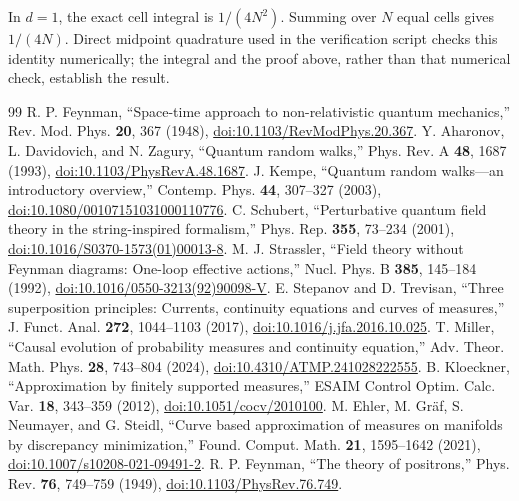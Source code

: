 \documentclass[aip,jmp,reprint,onecolumn,amsmath,amssymb]{revtex4-2}
\theoremstyle{definition}
\begin{document}
In $d=1$, the exact cell integral is $1/(4N^2)$. Summing over $N$ equal cells gives $1/(4N)$. Direct midpoint quadrature used in the verification script checks this identity numerically; the integral and the proof above, rather than that numerical check, establish the result.
\begin{thebibliography}{99}
 R. P. Feynman, ``Space-time approach to non-relativistic quantum mechanics,'' Rev. Mod. Phys. \textbf{20}, 367 (1948), \href{https://doi.org/10.1103/RevModPhys.20.367}{doi:10.1103/RevModPhys.20.367}.
 Y. Aharonov, L. Davidovich, and N. Zagury, ``Quantum random walks,'' Phys. Rev. A \textbf{48}, 1687 (1993), \href{https://doi.org/10.1103/PhysRevA.48.1687}{doi:10.1103/PhysRevA.48.1687}.
 J. Kempe, ``Quantum random walks---an introductory overview,'' Contemp. Phys. \textbf{44}, 307--327 (2003), \href{https://doi.org/10.1080/00107151031000110776}{doi:10.1080/00107151031000110776}.
 C. Schubert, ``Perturbative quantum field theory in the string-inspired formalism,'' Phys. Rep. \textbf{355}, 73--234 (2001), \href{https://doi.org/10.1016/S0370-1573(01)00013-8}{doi:10.1016/S0370-1573(01)00013-8}.
 M. J. Strassler, ``Field theory without Feynman diagrams: One-loop effective actions,'' Nucl. Phys. B \textbf{385}, 145--184 (1992), \href{https://doi.org/10.1016/0550-3213(92)90098-V}{doi:10.1016/0550-3213(92)90098-V}.
 E. Stepanov and D. Trevisan, ``Three superposition principles: Currents, continuity equations and curves of measures,'' J. Funct. Anal. \textbf{272}, 1044--1103 (2017), \href{https://doi.org/10.1016/j.jfa.2016.10.025}{doi:10.1016/j.jfa.2016.10.025}.
 T. Miller, ``Causal evolution of probability measures and continuity equation,'' Adv. Theor. Math. Phys. \textbf{28}, 743--804 (2024), \href{https://doi.org/10.4310/ATMP.241028222555}{doi:10.4310/ATMP.241028222555}.
 B. Kloeckner, ``Approximation by finitely supported measures,'' ESAIM Control Optim. Calc. Var. \textbf{18}, 343--359 (2012), \href{https://doi.org/10.1051/cocv/2010100}{doi:10.1051/cocv/2010100}.
 M. Ehler, M. Gr\"af, S. Neumayer, and G. Steidl, ``Curve based approximation of measures on manifolds by discrepancy minimization,'' Found. Comput. Math. \textbf{21}, 1595--1642 (2021), \href{https://doi.org/10.1007/s10208-021-09491-2}{doi:10.1007/s10208-021-09491-2}.
 R. P. Feynman, ``The theory of positrons,'' Phys. Rev. \textbf{76}, 749--759 (1949), \href{https://doi.org/10.1103/PhysRev.76.749}{doi:10.1103/PhysRev.76.749}.
\end{thebibliography}
\end{document}
